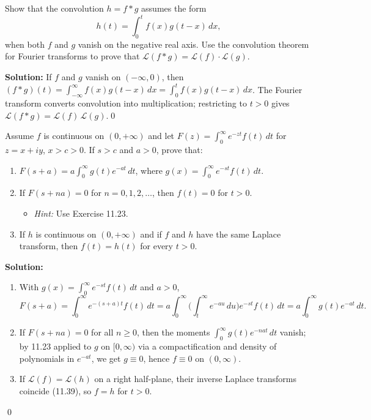 \begin{problembox}
Show that the convolution $h = f * g$ assumes the form
\[
h(t) = \int_0^t f(x) g(t - x) \, dx,
\]
when both $f$ and $g$ vanish on the negative real axis. Use the convolution theorem for Fourier transforms to prove that $\mathcal{L}(f * g) = \mathcal{L}(f) \cdot \mathcal{L}(g)$.
\end{problembox}

\noindent\textbf{Solution:}
If $f$ and $g$ vanish on $(-\infty,0)$, then $(f*g)(t)=\int_{-\infty}^{\infty} f(x)g(t-x)\,dx=\int_0^t f(x)g(t-x)\,dx$. The Fourier transform converts convolution into multiplication; restricting to $t>0$ gives $\mathcal L(f*g)=\mathcal L(f)\,\mathcal L(g)$.\qed


\begin{problembox}
Assume $f$ is continuous on $(0, +\infty)$ and let $F(z) = \int_0^\infty e^{-zt} f(t) \, dt$ for $z = x + iy$, $x > c > 0$. If $s > c$ and $a > 0$, prove that:
\begin{enumerate}[label=(\alph*)]
\item $F(s + a) = a \int_0^\infty g(t) e^{-at} \, dt$, where $g(x) = \int_0^\infty e^{-st} f(t) \, dt$.
\item If $F(s + na) = 0$ for $n = 0, 1, 2, \dots$, then $f(t) = 0$ for $t > 0$.
\begin{itemize}
\item \textit{Hint:} Use Exercise 11.23.
\end{itemize}
\item If $h$ is continuous on $(0, +\infty)$ and if $f$ and $h$ have the same Laplace transform, then $f(t) = h(t)$ for every $t > 0$.
\end{enumerate}
\end{problembox}

\noindent\textbf{Solution:}
\begin{enumerate}[label=(\alph*)]
\item With $g(x)=\int_0^{\infty} e^{-st} f(t)\,dt$ and $a>0$,
\[F(s+a)=\int_0^{\infty} e^{-(s+a)t}f(t)\,dt=a\int_0^{\infty} \Big(\int_t^{\infty} e^{-au}\,du\Big) e^{-st}f(t)\,dt=a\int_0^{\infty} g(t)e^{-at}\,dt.\]
\item If $F(s+na)=0$ for all $n\ge0$, then the moments $\int_0^{\infty} g(t) e^{-nat}\,dt$ vanish; by 11.23 applied to $g$ on $[0,\infty)$ via a compactification and density of polynomials in $e^{-at}$, we get $g\equiv0$, hence $f\equiv0$ on $(0,\infty)$.
\item If $\mathcal L(f)=\mathcal L(h)$ on a right half-plane, their inverse Laplace transforms coincide (11.39), so $f=h$ for $t>0$.
\end{enumerate}\qed


